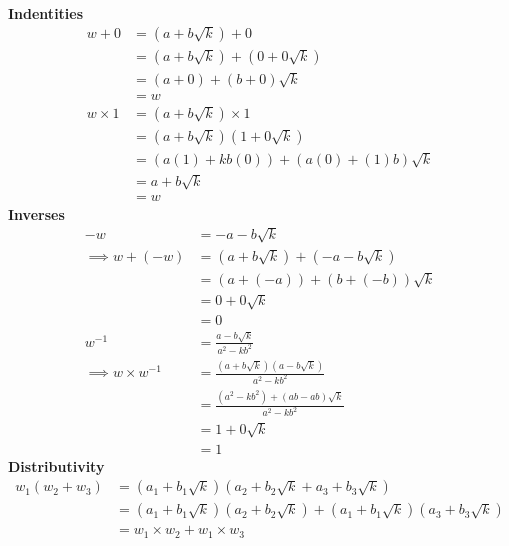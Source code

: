 \documentclass[addpoints]{exam}
\theoremstyle{mytheoremstyle}
\theoremstyle{mytheoremstyle}
\theoremstyle{myproblemstyle}
\begin{document}
\begin{questions}
\begin{parts}
\begin{solution}
\begin{align*}
            \end{align*}
            \textbf{Indentities}
            \begin{align*}
                w+0       & = (a+b\sqrt{k})+0                  \\
                          & = (a+b\sqrt{k})+(0+0\sqrt{k})      \\
                          & = (a+0)+(b+0)\sqrt{k}              \\
                          & = w                                \\
                w\times 1 & = (a+b\sqrt{k})\times 1            \\
                          & = (a+b\sqrt{k})(1+0\sqrt{k})       \\
                          & = (a(1)+kb(0))+(a(0)+(1)b)\sqrt{k} \\
                          & = a+b\sqrt{k}                      \\
                          & = w
            \end{align*}
            \textbf{Inverses}
            \begin{align*}
                -w                      & = -a-b\sqrt{k}                                        \\
                \implies w+(-w)         & = (a+b\sqrt{k})+(-a-b\sqrt{k})                        \\
                                        & = (a+(-a))+(b+(-b))\sqrt{k}                           \\
                                        & = 0+0\sqrt{k}                                         \\
                                        & = 0                                                   \\
                w^{-1}                  & = \frac{a-b\sqrt{k}}{a^{2}-kb^{2}}                    \\
                \implies w\times w^{-1} & = \frac{(a+b\sqrt{k})(a-b\sqrt{k})}{a^{2}-kb^{2}}     \\
                                        & = \frac{(a^{2}-kb^{2})+(ab-ab)\sqrt{k}}{a^{2}-kb^{2}} \\
                                        & = 1+0\sqrt{k}                                         \\
                                        & = 1
            \end{align*}
            \textbf{Distributivity}
            \begin{align*}
                w_{1}(w_{2}+w_{3}) & = (a_{1}+b_{1}\sqrt{k})(a_{2}+b_{2}\sqrt{k}+a_{3}+b_{3}\sqrt{k})                        \\
                                   & = (a_{1}+b_{1}\sqrt{k})(a_{2}+b_{2}\sqrt{k})+(a_{1}+b_{1}\sqrt{k})(a_{3}+b_{3}\sqrt{k}) \\
                                   & = w_{1}\times w_{2}+w_{1}\times w_{3}
            \end{align*}


\end{solution}
\end{parts}
\end{questions}
\end{document}
